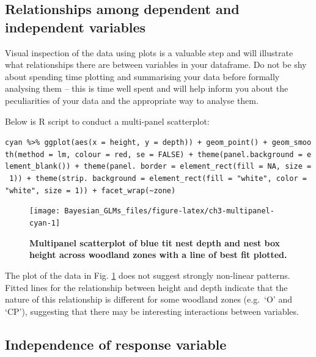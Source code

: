 \documentclass[
]{book}
\begin{document}
\hypertarget{relationships-among-dependent-and-independent-variables}{%
\subsection{Relationships among dependent and independent variables}\label{relationships-among-dependent-and-independent-variables}}

Visual inspection of the data using plots is a valuable step and will illustrate what relationships there are between variables in your dataframe. Do not be shy about spending time plotting and summarising your data before formally analysing them -- this is time well spent and will help inform you about the peculiarities of your data and the appropriate way to analyse them.

Below is R script to conduct a multi-panel scatterplot:

\texttt{cyan\ \%\textgreater{}\%\ ggplot(aes(x\ =\ height,\ y\ =\ depth))\ +\ geom\_point()\ +\ geom\_smooth(method\ =\ \textquotesingle{}lm\textquotesingle{},\ colour\ =\ \textquotesingle{}red\textquotesingle{},\ se\ =\ FALSE)\ +\ theme(panel.background\ =\ element\_blank())\ +\ theme(panel.\ border\ =\ element\_rect(fill\ =\ NA,\ size\ =\ 1))\ +\ theme(strip.\ background\ =\ element\_rect(fill\ =\ "white",\ color\ =\ "white",\ size\ =\ 1))\ +\ facet\_wrap(\textasciitilde{}zone)}



\begin{figure}

{\centering \texttt{[image: Bayesian\_GLMs\_files/figure-latex/ch3-multipanel-cyan-1]} 

}

\caption{\textbf{Multipanel scatterplot of blue tit nest depth and nest box height across woodland zones with a line of best fit plotted.}}\label{fig:ch3-multipanel-cyan}
\end{figure}

The plot of the data in Fig. \ref{fig:ch3-multipanel-cyan} does not suggest strongly non-linear patterns. Fitted lines for the relationship between height and depth indicate that the nature of this relationship is different for some woodland zones (e.g.~`O' and `CP'), suggesting that there may be interesting interactions between variables.

\hypertarget{independence}{%
\subsection{Independence of response variable}\label{independence}}
\end{document}
